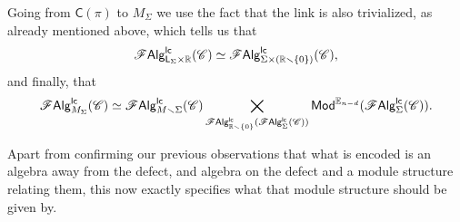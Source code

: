\documentclass[../text]{subfiles}
\begin{document}
Going from $\mathsf{C}(\pi)$ to $M_{\Sigma}$ we use the fact that the link is also trivialized, as already mentioned above, which tells us that
%
\begin{equation}
    \mathscr{F} \mathsf{Alg}^{\mathsf{lc}}_{\mathsf{L}_{\Sigma} \times \mathbb{R}} (\mathscr{C}) \simeq \mathscr{F} \mathsf{Alg}^{\mathsf{lc}}_{\Sigma \times (\mathbb{R} \smallsetminus \{0\})} (\mathscr{C}),
\end{equation}
%
and finally, that
% 
\begin{equation}
    \mathscr{F} \mathsf{Alg}^{\mathsf{lc}}_{M_\Sigma} (\mathscr{C}) \simeq \mathscr{F} \mathsf{Alg}^{\mathsf{lc}}_{M \smallsetminus \Sigma} (\mathscr{C}) \bigtimes_{\mathscr{F} \mathsf{Alg}^{\mathsf{lc}}_{\mathbb{R} \smallsetminus \{0\}} (\mathscr{F} \mathsf{Alg}^{\mathsf{lc}}_{\Sigma} (\mathscr{C}))} \mathsf{Mod}^{\mathbb{E}_{n-d}} (\mathscr{F} \mathsf{Alg}^{\mathsf{lc}}_{\Sigma} (\mathscr{C})).
\end{equation}

Apart from confirming our previous observations that what is encoded is an algebra away from the defect, and algebra on the defect and a module structure relating them, this now exactly specifies what that module structure should be given by.




\end{document}
